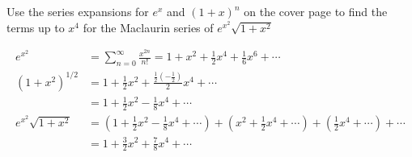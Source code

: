 \documentclass[12pt,answers]{exam}
\begin{document}
\begin{questions}
\question[8]
Use the series expansions for $e^x$ and $(1+x)^n$ on the cover page to find the terms up to $x^4$ for the Maclaurin series of $e^{x^2} \sqrt{1+x^2}$
\begin{solution}
    \begin{align*}
        e^{x^2} 
        &= \sum_{n=0}^\infty \frac{x^{2n}}{n!} = 1 + x^2 + \frac 12 x^4 + \frac16 x^6 + \cdots \\ 
        (1+x^2)^{1/2} 
        &= 1 + \frac12 x^2 + \frac{\frac12 (-\frac12)}{2}x^4 + \cdots \\
        &= 1 + \frac12 x^2 - \frac18 x^4 + \cdots \\
        e^{x^2} \sqrt{1+x^2} 
        &= \left(1 + \frac12 x^2 - \frac 18 x^4 + \cdots \right)
        + \left( x^2 + \frac12 x^4 + \cdots \right)
        + \left(\frac12 x^4 + \cdots \right) + \cdots \\ 
        &= \boxed{1 + \frac32 x^2 + \frac78 x^4} + \cdots
    \end{align*}
\end{solution}

\newpage
\question
{}
\end{questions}
\end{document}
